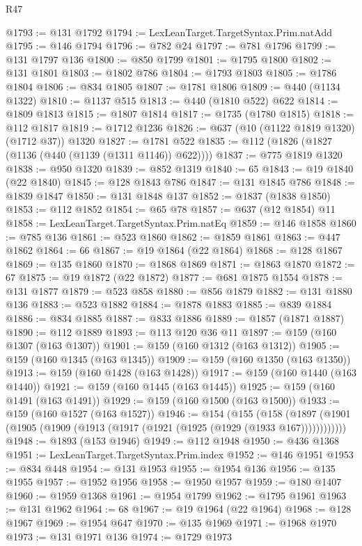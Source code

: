 \begin{lexlean}{R47}
\begin{coremodule}
@1793 := @131 @1792
@1794 := LexLeanTarget.TargetSyntax.Prim.natAdd
@1795 := @146 @1794
@1796 := @782 @24
@1797 := @781 @1796
@1799 := @131 @1797 @136
@1800 := @850 @1799
@1801 := @1795 @1800
@1802 := @131 @1801
@1803 := @1802 @786
@1804 := @1793 @1803
@1805 := @1786 @1804
@1806 := @834 @1805
@1807 := @1781 @1806
@1809 := @440 (@1134 @1322)
@1810 := @1137 @515
@1813 := @440 (@1810 @522) @622
@1814 := @1809 @1813
@1815 := @1807 @1814
@1817 := @1735 (@1780 @1815)
@1818 := @112 @1817
@1819 := @1712 @1236
@1826 := @637 (@10 (@1122 @1819 @1320) (@1712 @37)) @1320
@1827 := @1781 @522
@1835 := @112 (@1826 (@1827 (@1136 (@440 (@1139 (@1311 @1146)) @622))))
@1837 := @775 @1819 @1320
@1838 := @950 @1320
@1839 := @852 @1319
@1840 := 65
@1843 := @19 @1840 (@22 @1840)
@1845 := @128 @1843 @786
@1847 := @131 @1845 @786
@1848 := @1839 @1847
@1850 := @131 @1848 @137
@1852 := @1837 (@1838 @1850)
@1853 := @112 @1852
@1854 := @65 @78
@1857 := @637 (@12 @1854) @11
@1858 := LexLeanTarget.TargetSyntax.Prim.natEq
@1859 := @146 @1858
@1860 := @785 @136
@1861 := @523 @1860
@1862 := @1859 @1861
@1863 := @447 @1862
@1864 := 66
@1867 := @19 @1864 (@22 @1864)
@1868 := @128 @1867
@1869 := @135 @1860
@1870 := @1868 @1869
@1871 := @1863 @1870
@1872 := 67
@1875 := @19 @1872 (@22 @1872)
@1877 := @681 @1875 @1554
@1878 := @131 @1877
@1879 := @523 @858
@1880 := @856 @1879
@1882 := @131 @1880 @136
@1883 := @523 @1882
@1884 := @1878 @1883
@1885 := @839 @1884
@1886 := @834 @1885
@1887 := @833 @1886
@1889 := @1857 (@1871 @1887)
@1890 := @112 @1889
@1893 := @113 @120 @36 @11
@1897 := @159 (@160 @1307 (@163 @1307))
@1901 := @159 (@160 @1312 (@163 @1312))
@1905 := @159 (@160 @1345 (@163 @1345))
@1909 := @159 (@160 @1350 (@163 @1350))
@1913 := @159 (@160 @1428 (@163 @1428))
@1917 := @159 (@160 @1440 (@163 @1440))
@1921 := @159 (@160 @1445 (@163 @1445))
@1925 := @159 (@160 @1491 (@163 @1491))
@1929 := @159 (@160 @1500 (@163 @1500))
@1933 := @159 (@160 @1527 (@163 @1527))
@1946 := @154
    (@155
      (@158 (@1897 (@1901 (@1905 (@1909 (@1913 (@1917 (@1921 (@1925 (@1929 (@1933 @167))))))))))))
@1948 := @1893 (@153 @1946)
@1949 := @112 @1948
@1950 := @436 @1368
@1951 := LexLeanTarget.TargetSyntax.Prim.index
@1952 := @146 @1951
@1953 := @834 @448
@1954 := @131 @1953
@1955 := @1954 @136
@1956 := @135 @1955
@1957 := @1952 @1956
@1958 := @1950 @1957
@1959 := @180 @1407
@1960 := @1959 @1368
@1961 := @1954 @1799
@1962 := @1795 @1961
@1963 := @131 @1962
@1964 := 68
@1967 := @19 @1964 (@22 @1964)
@1968 := @128 @1967
@1969 := @1954 @647
@1970 := @135 @1969
@1971 := @1968 @1970
@1973 := @131 @1971 @136
@1974 := @1729 @1973

\end{coremodule}
\end{lexlean}
